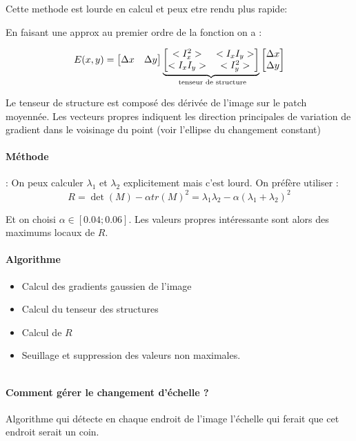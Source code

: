 \documentclass[main.tex]{subfiles}
\begin{document}
Cette methode est lourde en calcul et peux etre rendu plus rapide:

\begin{prop}
  En faisant une approx au premier ordre de la fonction on a :

\[
  E(x,y) =  \begin{bmatrix} \Delta x & \Delta y \end{bmatrix}
  \underbrace{\begin{bmatrix}
    <I_x^2> & <I_xI_y> \\
    <I_xI_y> & <I_y^2>
  \end{bmatrix}}_{\text{ tenseur de structure}}
 \begin{bmatrix} \Delta x \\ \Delta y \end{bmatrix}
\]
\end{prop}

\begin{rem}
Le tenseur de structure est composé des dérivée de l'image sur le patch moyennée. Les vecteurs propres indiquent les direction principales de variation de gradient
dans le voisinage du point (voir l’ellipse du changement constant)
\end{rem}

\paragraph{Méthode} :
On peux calculer $\lambda_1$ et $\lambda_2$ explicitement mais c'est lourd. On préfère utiliser :
\[
  R = \det(M) - \alpha tr(M)^2 = \lambda_1\lambda_2 -\alpha(\lambda_1+\lambda_2)^2
\]

Et on choisi $\alpha \in[0.04; 0.06]$. Les valeurs propres intéressante sont alors des maximums locaux de $R$.

\paragraph{Algorithme}
\begin{itemize}
\item Calcul des gradients  gaussien de l'image
\item Calcul du tenseur des structures
\item Calcul de $R$
\item Seuillage et suppression des valeurs non maximales.
\end{itemize}
\begin{listing}
  \inputminted{python}{harris.py}
\end{listing}


\paragraph{Comment gérer le changement d'échelle ?} Algorithme qui détecte en chaque endroit de l'image l'échelle qui ferait que cet endroit serait un coin.
\end{document}
